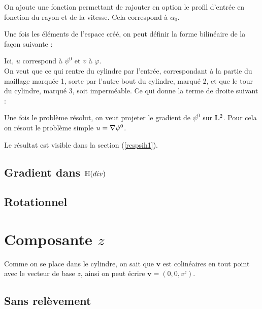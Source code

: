

On ajoute une fonction permettant de rajouter en option le profil d'entrée en fonction du rayon et de la vitesse. Cela correspond à $\alpha_0$.



Une fois les éléments de l'espace créé, on peut définir la forme bilinéaire de la façon suivante :



Ici, $u$ correspond à $\psi^0$ et $v$ à $\varphi$.\\

On veut que ce qui rentre du cylindre par l'entrée, correspondant à la partie du maillage marquée 1, sorte par l'autre bout du cylindre, marqué 2, et que le tour du cylindre, marqué 3, soit imperméable. Ce qui donne la terme de droite suivant :



Une fois le problème résolut, on veut projeter le gradient de $\psi^0$ sur ${\mathbb{L}}^2$. Pour cela on résout le problème simple $u={\nabla}\psi^0$.



Le résultat est visible dans la section (\ref{respsih1}).

\subsection{Gradient dans ${\mathbb{H}}(div)$}

\subsection{Rotationnel}

\section{Composante $z$}

Comme on se place dans le cylindre, on sait que $\bm{v}$ est colinéaires en tout point avec le vecteur de base $z$, ainsi on peut écrire $\bm{v}=(0,0,v^z)$.

\subsection{Sans relèvement}
\label{impZSR}


